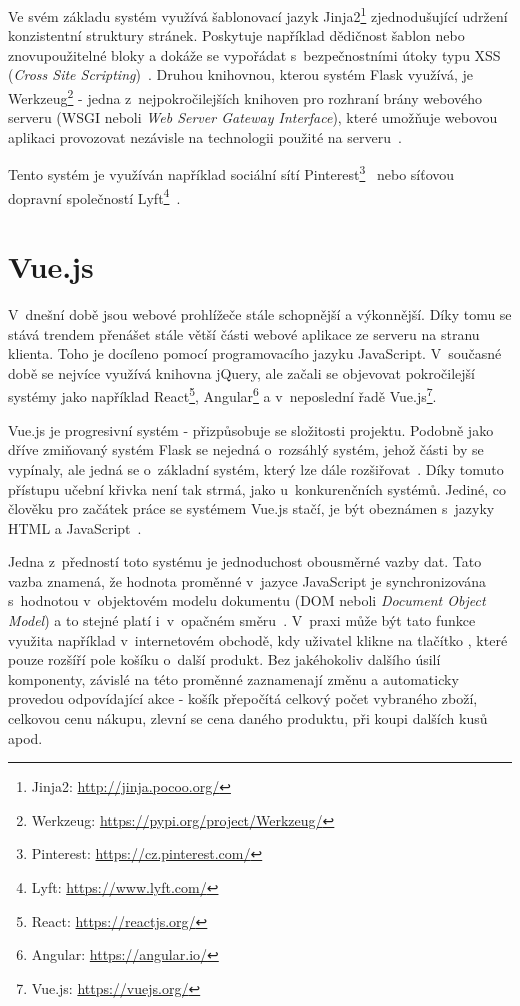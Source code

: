 Ve svém základu systém využívá šablonovací jazyk Jinja2\footnote{Jinja2: \url{http://jinja.pocoo.org/}} zjednodušující udržení konzistentní struktury stránek. Poskytuje například dědičnost šablon nebo znovupoužitelné bloky a dokáže se vypořádat s~bezpečnostními útoky typu XSS (\emph{Cross Site Scripting})~\cite{bib:jinja}.
Druhou knihovnou, kterou systém Flask využívá, je Werkzeug\footnote{Werkzeug: \url{https://pypi.org/project/Werkzeug/}} - jedna z~nejpokročilejších knihoven pro rozhraní brány webového serveru (WSGI neboli \emph{Web Server Gateway Interface}), které umožňuje webovou aplikaci provozovat nezávisle na technologii použité na serveru~\cite{bib:flask-pep}.

Tento systém je využíván například sociální sítí Pinterest\footnote{Pinterest: \url{https://cz.pinterest.com/}}~\cite{bib:flask-pinterest}
nebo síťovou dopravní společností Lyft\footnote{Lyft: \url{https://www.lyft.com/}}~\cite{bib:flask-lyft}.



\section{Vue.js}\label{section:Vue.js}
V~dnešní době jsou webové prohlížeče stále schopnější a výkonnější. Díky tomu se stává trendem přenášet stále větší části webové aplikace ze serveru na stranu klienta. Toho je docíleno pomocí programovacího jazyku JavaScript. V~současné době se nejvíce využívá knihovna jQuery, %
ale začali se objevovat pokročilejší systémy jako například React\footnote{React: \url{https://reactjs.org/}}, Angular\footnote{Angular: \url{https://angular.io/}} a v~neposlední řadě Vue.js\footnote{Vue.js: \url{https://vuejs.org/}}.

Vue.js je progresivní systém - přizpůsobuje se složitosti projektu. Podobně jako dříve zmiňovaný systém Flask se nejedná o~rozsáhlý systém, jehož části by se vypínaly, ale jedná se o~základní systém, který lze dále rozšiřovat~\cite{bib:vue-progressive}.
Díky tomuto přístupu učební křivka není tak strmá, jako u~konkurenčních systémů. Jediné, co člověku pro začátek práce se systémem Vue.js stačí, je být obeznámen s~jazyky HTML a JavaScript~\cite{bib:vue-curve}.

Jedna z~předností toto systému je jednoduchost obousměrné vazby dat. Tato vazba znamená, že hodnota proměnné v~jazyce JavaScript je synchronizována s~hodnotou v~objektovém modelu dokumentu (DOM neboli \emph{Document Object Model}) a to stejné platí i~v~opačném směru~\cite{bib:vue-binding}.
V~praxi může být tato funkce využita například v~internetovém obchodě, kdy uživatel klikne na tlačítko , které pouze rozšíří pole košíku o~další produkt. Bez jakéhokoliv dalšího úsilí komponenty, závislé na této proměnné zaznamenají změnu a automaticky provedou odpovídající akce - košík přepočítá celkový počet vybraného zboží, celkovou cenu nákupu, zlevní se cena daného produktu, při koupi dalších kusů apod. 


